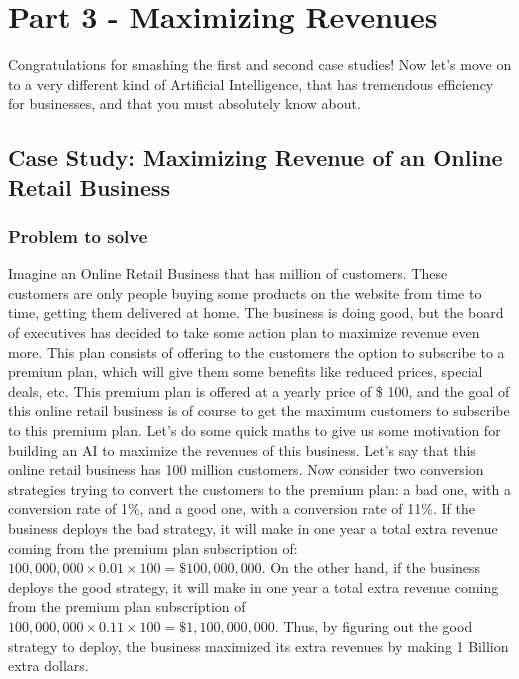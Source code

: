 \documentclass[]{book}
\begin{document}
\hypertarget{part-3---maximizing-revenues}{%
\chapter{Part 3 - Maximizing Revenues}\label{part-3---maximizing-revenues}}

Congratulations for smashing the first and second case studies! Now let's move on to a very different kind of Artificial Intelligence, that has tremendous efficiency for businesses, and that you must absolutely know about.

\hypertarget{case-study-maximizing-revenue-of-an-online-retail-business}{%
\section{Case Study: Maximizing Revenue of an Online Retail Business}\label{case-study-maximizing-revenue-of-an-online-retail-business}}

\hypertarget{problem-to-solve}{%
\subsection{Problem to solve}\label{problem-to-solve}}

Imagine an Online Retail Business that has million of customers. These customers are only people buying some products on the website from time to time, getting them delivered at home. The business is doing good, but the board of executives has decided to take some action plan to maximize revenue even more. This plan consists of offering to the customers the option to subscribe to a premium plan, which will give them some benefits like reduced prices, special deals, etc. This premium plan is offered at a yearly price of \$ 100, and the goal of this online retail business is of course to get the maximum customers to subscribe to this premium plan. Let's do some quick maths to give us some motivation for building an AI to maximize the revenues of this business. Let's say that this online retail business has 100 million customers. Now consider two conversion strategies trying to convert the customers to the premium plan: a bad one, with a conversion rate of 1\%, and a good one, with a conversion rate of 11\%. If the business deploys the bad strategy, it will make in one year a total extra revenue coming from the premium plan subscription of: \(100,000,000 \times 0.01 \times 100 = \$ 100,000,000\). On the other hand, if the business deploys the good strategy, it will make in one year a total extra revenue coming from the premium plan subscription of \(100,000,000 \times 0.11 \times 100 = \$ 1,100,000,000\). Thus, by figuring out the good strategy to deploy, the business maximized its extra revenues by making 1 Billion extra dollars.
\end{document}
